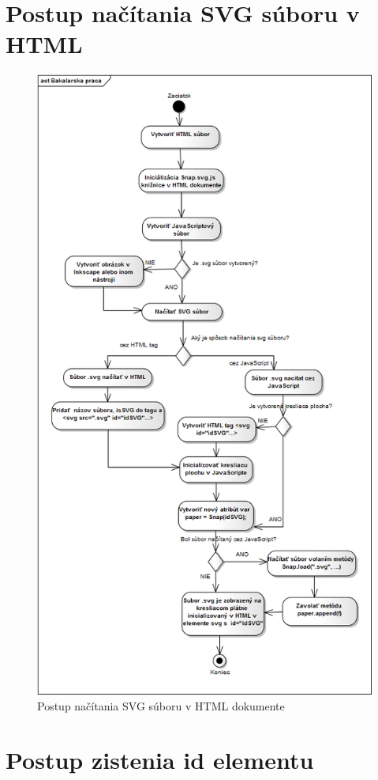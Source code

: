 	\section{Postup načítania SVG súboru v HTML}
\begin{figure}[H]
	\centering
	\includegraphics[width=0.70\linewidth]{uml/aktivityInicializacie}
	\caption{Postup načítania SVG súboru v HTML dokumente}
	\label{fig:aktivity1}
\end{figure}

\section{Postup zistenia id elementu}

